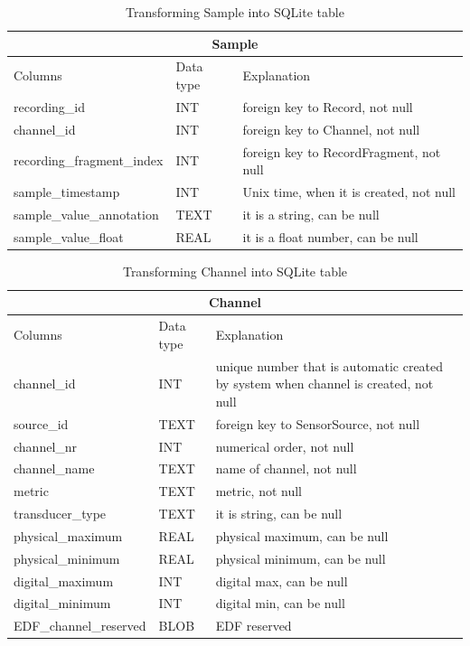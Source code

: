 \begin{table}
\begin{center}
\begin{tabular}{ |p{4cm}|p{1.8cm}|p{6.2cm}|  }
 \hline
 \multicolumn{3}{|c|}{Sample} \\
 \hline
 Columns& Data type & Explanation \\
 \hline
 recording\_id& INT& foreign key to Record, not null\\
 channel\_id& INT& foreign key to Channel, not null\\
 recording\_fragment\_index& INT& foreign key to RecordFragment, not null\\
 sample\_timestamp& INT& Unix time, when it is created, not null\\
 sample\_value\_annotation& TEXT& it is a string, can be null\\
 sample\_value\_float& REAL& it is a float number, can be null\\
 \hline
\end{tabular}
\end{center}
\caption{Transforming Sample into SQLite table}
\label{tab:SampleTypeSQL}
\end{table}
\begin{table}
\begin{center}
\begin{tabular}{ |p{4cm}|p{1.8cm}|p{6.2cm}|  }
 \hline
 \multicolumn{3}{|c|}{Channel} \\
 \hline
 Columns& Data type & Explanation \\
 \hline
 channel\_id& INT& unique number that is automatic created by system when channel is created, not null\\
 source\_id& TEXT& foreign key to SensorSource, not null\\
 channel\_nr& INT& numerical order, not null\\
 channel\_name& TEXT& name of channel, not null\\
 metric& TEXT& metric, not null\\
 transducer\_type& TEXT& it is string, can be null\\
 physical\_maximum& REAL& physical maximum, can be null\\
 physical\_minimum& REAL& physical minimum, can be null\\
 digital\_maximum& INT& digital max, can be null\\
 digital\_minimum& INT& digital min, can be null\\
 EDF\_channel\_reserved& BLOB& EDF reserved\\
 \hline
\end{tabular}
\end{center}
\caption{Transforming Channel into SQLite table}
\label{tab:ChannelTypeSQL}
\end{table}
